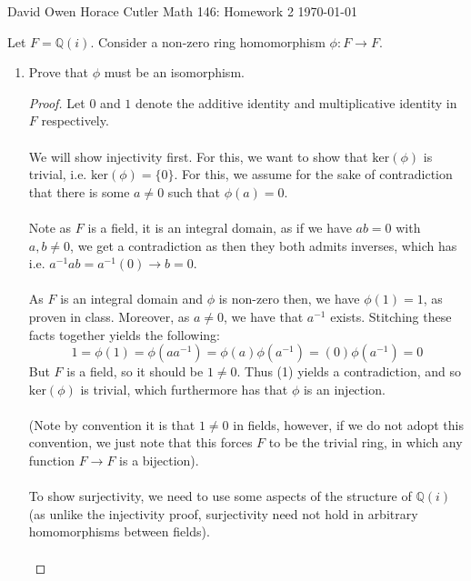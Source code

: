 \documentclass[12pt]{article}
\newenvironment{ex}[2][Exercise]{\begin{trivlist}
\item[\hskip \labelsep {\bfseries #1}\hskip \labelsep {\bfseries #2.}]}{\end{trivlist}}
\begin{document}
\noindent David Owen Horace Cutler \hfill {\Large Math 146: Homework 2} \hfill \today

\begin{ex}{1}
    Let $F = \mathbb{Q}(i)$. Consider a non-zero ring homomorphism $\phi : F \rightarrow F$. 
    \begin{enumerate}[label=(\alph*)]
        \item Prove that $\phi$ must be an isomorphism.
        \begin{proof}
            Let $0$ and $1$ denote the additive identity and multiplicative identity in $F$ respectively. \\ \\
            We will show injectivity first. For this, we want to show that $\text{ker}(\phi)$ is trivial, i.e. $\text{ker}(\phi) = \{0\}$. For this, we assume for the sake of contradiction that there is some $a \neq 0$ such that $\phi(a) = 0$. \\ \\
            Note as $F$ is a field, it is an integral domain, as if we have $ab = 0$ with $a, b \neq 0$, we get a contradiction as then they both admits inverses, which has i.e. $a^{-1}ab = a^{-1}(0) \rightarrow b = 0$. \\ \\
            As $F$ is an integral domain and $\phi$ is non-zero then, we have $\phi(1) = 1$, as proven in class. Moreover, as $a \neq 0$, we have that $a^{-1}$ exists. Stitching these facts together yields the following:
            \begin{equation} 1 = \phi(1) = \phi(aa^{-1}) = \phi(a)\phi(a^{-1}) = (0)\phi(a^{-1}) = 0 \end{equation}
            But $F$ is a field, so it should be $1 \neq 0$. Thus (1) yields a contradiction, and so $\text{ker}(\phi)$ is trivial, which furthermore has that $\phi$ is an injection. \\ \\
            (Note by convention it is that $1 \neq 0$ in fields, however, if we do not adopt this convention, we just note that this forces $F$ to be the trivial ring, in which any function $F \rightarrow F$ is a bijection). \\ \\
            To show surjectivity, we need to use some aspects of the structure of $\mathbb{Q}(i)$ (as unlike the injectivity proof, surjectivity need not hold in arbitrary homomorphisms between fields). \\ \\

\end{proof}
\end{enumerate}
\end{ex}
\end{document}
